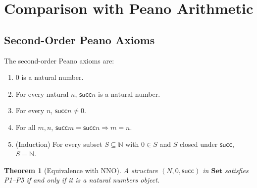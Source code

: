 \documentclass[12pt]{article}
\newtheorem{theorem}{Theorem}[section]
\theoremstyle{definition}
\theoremstyle{remark}
\newcommand{\N}{\mathbb{N}}
\newcommand{\Set}{\mathbf{Set}}
\newcommand{\suc}{\mathsf{succ}}
\begin{document}
\section{Comparison with Peano Arithmetic}
\label{sec:peano}

\subsection{Second-Order Peano Axioms}

The second-order Peano axioms are:
\begin{enumerate}
  \item[\textbf{P1}] $0$ is a natural number.
  \item[\textbf{P2}] For every natural $n$, $\suc n$ is a natural number.
  \item[\textbf{P3}] For every $n$, $\suc n \neq 0$.
  \item[\textbf{P4}] For all $m, n$, $\suc m = \suc n \Rightarrow m = n$.
  \item[\textbf{P5}] (Induction) For every subset $S \subseteq \N$ with $0 \in S$ and $S$ closed under $\suc$, $S = \N$.
\end{enumerate}

\begin{theorem}[Equivalence with NNO]
\label{thm:peano-nno}
A structure $(N, 0, \suc)$ in $\Set$ satisfies P1--P5 if and only if it is a natural numbers object.
\end{theorem}
\end{document}
